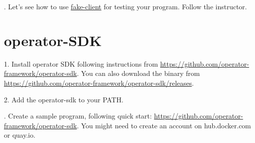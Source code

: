 \documentclass[11pt, letterpaper]{article}
\begin{document}
. Let's see how to use \href{https://github.com/kubernetes/client-go/blob/master/testing/fake.go}{fake-client} for testing your program. Follow the instructor.










%
\section{operator-{\small SDK}}

1. Install operator {\small SDK} following instructions from \href{https://github.com/operator-framework/operator-sdk}{https://github.com/operator-framework/operator-sdk}. You can also download the binary from \href{https://github.com/operator-framework/operator-sdk/releases}{https://github.com/operator-framework/operator-sdk/releases}. 
\bigskip

2. Add the operator-sdk to your {\small PATH}.

. Create a sample program, following quick start: \href{https://github.com/operator-framework/operator-sdk}{https://github.com/operator-framework/operator-sdk}. You might need to create an account on hub.docker.com or quay.io.
\end{document}
